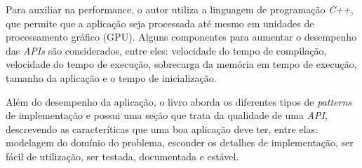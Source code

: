 Para auxiliar na performance, o autor utiliza a linguagem de programação \textit{C++}, que permite que a aplicação seja processada até mesmo em unidades de processamento gráfico (GPU). Alguns componentes para aumentar o desempenho das \textit{APIs} são considerados, entre eles: velocidade do tempo de compilação, velocidade do tempo de execução, sobrecarga da memória em tempo de execução, tamanho da aplicação e o tempo de inicialização.

Além do desempenho da aplicação, o livro aborda os diferentes tipos de \textit{patterns} de implementação e possui uma seção que trata da qualidade de uma \textit{API}, descrevendo as caracteríticas que uma boa aplicação deve ter, entre elas: modelagem do domínio do problema, esconder os detalhes de implementação, ser fácil de utilização, ser testada, documentada e estável.
